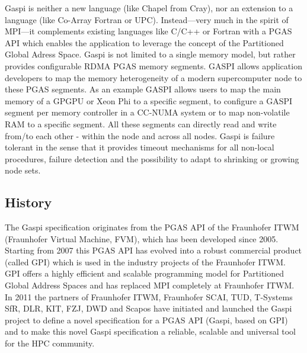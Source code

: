 \documentclass[a4paper]{article}
\newlength{\st}\setlength{\st}{0pt}
\newcommand{\GASPI}{{\sc Gaspi}}
\begin{document}
\GASPI{} is neither a new language (like Chapel from Cray), nor an
extension to a language (like Co-Array Fortran or UPC). Instead---very
much in the spirit of MPI---it complements existing languages like
C/C++ or Fortran with a PGAS API which enables the application to
leverage the concept of the Partitioned Global Adress Space. \GASPI{}
is not limited to a single memory model, but rather provides
configurable RDMA PGAS memory segments. GASPI allows application
developers to map the memory heterogeneity of a modern supercomputer
node to these PGAS segments. As an example GASPI allows users to map
the main memory of a GPGPU or Xeon Phi to a specific segment, to
configure a GASPI segment per memory controller in a CC-NUMA system or
to map non-volatile RAM to a specific segment. All these segments can
directly read and write from/to each other - within the node and
across all nodes.  \GASPI{} is failure tolerant in the sense that it
provides timeout mechanisms for all non-local procedures, failure
detection and the possibility to adapt to shrinking or growing node
sets.

\subsection{History}
The \GASPI{} specification originates from the PGAS API of the Fraunhofer
ITWM (Fraunhofer Virtual Machine, FVM), which has been developed since
2005. Starting from 2007 this PGAS API has evolved into a robust
commercial product (called GPI) which is used in the industry projects
of the Fraunhofer ITWM. GPI offers a highly efficient and scalable
programming model for Partitioned Global Address Spaces and has
replaced MPI completely at Fraunhofer ITWM. In 2011 the partners of
Fraunhofer ITWM, Fraunhofer SCAI, TUD, T-Systems SfR, DLR, KIT, FZJ,
DWD and Scapos have initiated and launched the \GASPI{} project to
define a novel specification for a PGAS API (\GASPI{}, based on GPI) and to
make this novel \GASPI{} specification a reliable, scalable and universal
tool for the HPC community.

% 
% 
\end{document}
